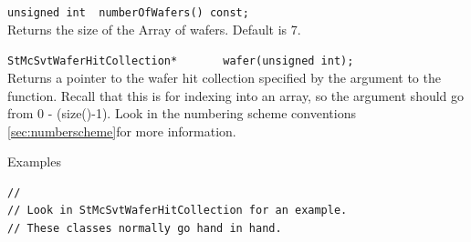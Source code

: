 \begin{Entry}
    \verb+unsigned int  numberOfWafers() const;+\\
    Returns the size of the Array of wafers.  Default is 7.

    \verb+StMcSvtWaferHitCollection*       wafer(unsigned int);+\\
    Returns a pointer to the wafer hit collection
    specified by the argument to the
    function.  Recall that this is for indexing into an array, so the
    argument should go from 0 - (size()-1).  Look in the
    numbering scheme conventions \ref{sec:numberscheme}for more information.

\item[Examples]
{\footnotesize
\begin{verbatim}
//
// Look in StMcSvtWaferHitCollection for an example.
// These classes normally go hand in hand.
\end{verbatim}
}%
\end{Entry}

\clearpage
%
%
